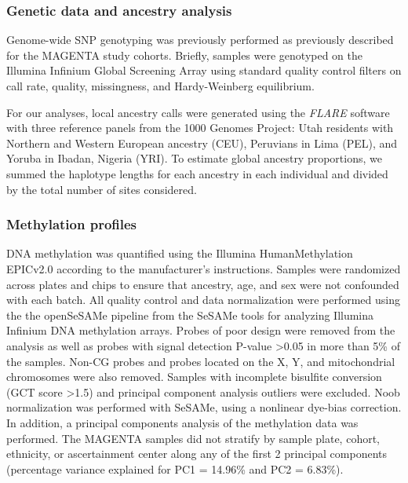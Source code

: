 \subsubsection*{Genetic data and ancestry analysis}
Genome-wide SNP genotyping was previously performed as previously described for the MAGENTA study cohorts. Briefly, samples were genotyped on the Illumina Infinium Global Screening Array using standard quality control filters on call rate, quality, missingness, and Hardy-Weinberg equilibrium. 

For our analyses, local ancestry calls were generated using the \textit{FLARE} software \citep{browning_fast_2023} with three reference panels from the 1000 Genomes Project: Utah residents with Northern and Western European ancestry (CEU),  Peruvians in Lima (PEL), and Yoruba in Ibadan, Nigeria (YRI). To estimate global ancestry proportions, we summed the haplotype lengths for each ancestry in each individual and divided by the total number of sites considered.

\subsubsection*{Methylation profiles}
DNA methylation was quantified using the Illumina HumanMethylation EPICv2.0 according to the manufacturer's instructions. Samples were randomized across plates and chips to ensure that ancestry, age, and sex were not confounded with each batch. All quality control and data normalization were performed using the the openSeSAMe pipeline from the SeSAMe \citep{wanding_zhou_sesame_2018} tools for analyzing Illumina Infinium DNA methylation arrays. Probes of poor design were removed from the analysis as well as probes with signal detection P-value \textgreater 0.05 in more than 5\% of the samples. Non-CG probes and probes located on the X, Y, and mitochondrial chromosomes were also removed. Samples with incomplete bisulfite conversion (GCT score \textgreater 1.5) and principal component analysis outliers were excluded. Noob normalization was performed with SeSAMe, using a nonlinear dye-bias correction. In addition, a principal components analysis of the  methylation data was performed. The MAGENTA samples did not stratify by sample plate, cohort, ethnicity, or ascertainment center along any of the first 2 principal components (percentage variance explained for PC1 = 14.96\% and PC2 = 6.83\%).


